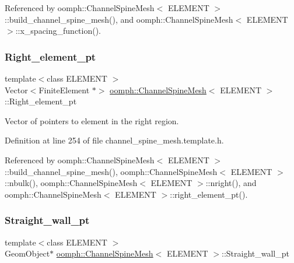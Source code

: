 Referenced by oomph\+::\+Channel\+Spine\+Mesh$<$ E\+L\+E\+M\+E\+N\+T $>$\+::build\+\_\+channel\+\_\+spine\+\_\+mesh(), and oomph\+::\+Channel\+Spine\+Mesh$<$ E\+L\+E\+M\+E\+N\+T $>$\+::x\+\_\+spacing\+\_\+function().

\mbox{\label{classoomph_1_1ChannelSpineMesh_a1cc77e7badcd1756b03aa307534011ec}} 
\subsubsection{\texorpdfstring{Right\+\_\+element\+\_\+pt}{Right\_element\_pt}}
{\footnotesize\ttfamily template$<$class E\+L\+E\+M\+E\+NT $>$ \\
Vector$<$Finite\+Element $\ast$$>$ \hyperlink{classoomph_1_1ChannelSpineMesh}{oomph\+::\+Channel\+Spine\+Mesh}$<$ E\+L\+E\+M\+E\+NT $>$\+::Right\+\_\+element\+\_\+pt\hspace{0.3cm}{\ttfamily [protected]}}



Vector of pointers to element in the right region. 



Definition at line 254 of file channel\+\_\+spine\+\_\+mesh.\+template.\+h.



Referenced by oomph\+::\+Channel\+Spine\+Mesh$<$ E\+L\+E\+M\+E\+N\+T $>$\+::build\+\_\+channel\+\_\+spine\+\_\+mesh(), oomph\+::\+Channel\+Spine\+Mesh$<$ E\+L\+E\+M\+E\+N\+T $>$\+::nbulk(), oomph\+::\+Channel\+Spine\+Mesh$<$ E\+L\+E\+M\+E\+N\+T $>$\+::nright(), and oomph\+::\+Channel\+Spine\+Mesh$<$ E\+L\+E\+M\+E\+N\+T $>$\+::right\+\_\+element\+\_\+pt().

\mbox{\label{classoomph_1_1ChannelSpineMesh_a34f4583f2aa944d5d1ff723f6a4123bf}} 
\subsubsection{\texorpdfstring{Straight\+\_\+wall\+\_\+pt}{Straight\_wall\_pt}}
{\footnotesize\ttfamily template$<$class E\+L\+E\+M\+E\+NT $>$ \\
Geom\+Object$\ast$ \hyperlink{classoomph_1_1ChannelSpineMesh}{oomph\+::\+Channel\+Spine\+Mesh}$<$ E\+L\+E\+M\+E\+NT $>$\+::Straight\+\_\+wall\+\_\+pt\hspace{0.3cm}{\ttfamily [protected]}}



